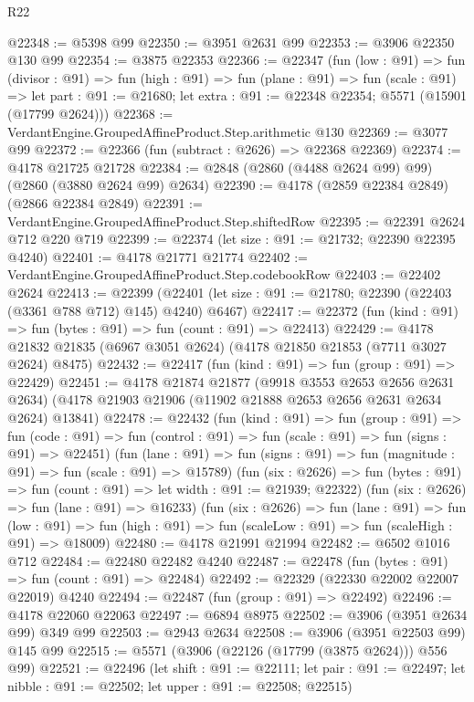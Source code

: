 \begin{lexlean}{R22}
\begin{coremodule}
@22348 := @5398 @99
@22350 := @3951 @2631 @99
@22353 := @3906 @22350 @130 @99
@22354 := @3875 @22353
@22366 := @22347
    (fun (low : @91) =>
    fun (divisor : @91) =>
    fun (high : @91) =>
    fun (plane : @91) =>
    fun (scale : @91) =>
    let part : @91 := @21680; let extra : @91 := @22348 @22354; @5571 (@15901 (@17799 @2624)))
@22368 := VerdantEngine.GroupedAffineProduct.Step.arithmetic @130
@22369 := @3077 @99
@22372 := @22366 (fun (subtract : @2626) => @22368 @22369)
@22374 := @4178 @21725 @21728
@22384 := @2848 (@2860 (@4488 @2624 @99) @99) (@2860 (@3880 @2624 @99) @2634)
@22390 := @4178 (@2859 @22384 @2849) (@2866 @22384 @2849)
@22391 := VerdantEngine.GroupedAffineProduct.Step.shiftedRow
@22395 := @22391 @2624 @712 @220 @719
@22399 := @22374 (let size : @91 := @21732; @22390 @22395 @4240)
@22401 := @4178 @21771 @21774
@22402 := VerdantEngine.GroupedAffineProduct.Step.codebookRow
@22403 := @22402 @2624
@22413 := @22399
    (@22401 (let size : @91 := @21780; @22390 (@22403 (@3361 @788 @712) @145) @4240) @6467)
@22417 := @22372 (fun (kind : @91) => fun (bytes : @91) => fun (count : @91) => @22413)
@22429 := @4178 @21832 @21835 (@6967 @3051 @2624) (@4178 @21850 @21853 (@7711 @3027 @2624) @8475)
@22432 := @22417 (fun (kind : @91) => fun (group : @91) => @22429)
@22451 := @4178
    @21874
    @21877
    (@9918 @3553 @2653 @2656 @2631 @2634)
    (@4178 @21903 @21906 (@11902 @21888 @2653 @2656 @2631 @2634 @2624) @13841)
@22478 := @22432
    (fun (kind : @91) =>
    fun (group : @91) =>
    fun (code : @91) => fun (control : @91) => fun (scale : @91) => fun (signs : @91) => @22451)
    (fun (lane : @91) => fun (signs : @91) => fun (magnitude : @91) => fun (scale : @91) => @15789)
    (fun (six : @2626) =>
    fun (bytes : @91) => fun (count : @91) => let width : @91 := @21939; @22322)
    (fun (six : @2626) => fun (lane : @91) => @16233)
    (fun (six : @2626) =>
    fun (lane : @91) =>
    fun (low : @91) => fun (high : @91) => fun (scaleLow : @91) => fun (scaleHigh : @91) => @18009)
@22480 := @4178 @21991 @21994
@22482 := @6502 @1016 @712
@22484 := @22480 @22482 @4240
@22487 := @22478 (fun (bytes : @91) => fun (count : @91) => @22484)
@22492 := @22329 (@22330 @22002 @22007 @22019) @4240
@22494 := @22487 (fun (group : @91) => @22492)
@22496 := @4178 @22060 @22063
@22497 := @6894 @8975
@22502 := @3906 (@3951 @2634 @99) @349 @99
@22503 := @2943 @2634
@22508 := @3906 (@3951 @22503 @99) @145 @99
@22515 := @5571 (@3906 (@22126 (@17799 (@3875 @2624))) @556 @99)
@22521 := @22496
    (let shift : @91 := @22111;
    let pair : @91 := @22497; let nibble : @91 := @22502; let upper : @91 := @22508; @22515)

\end{coremodule}
\end{lexlean}
